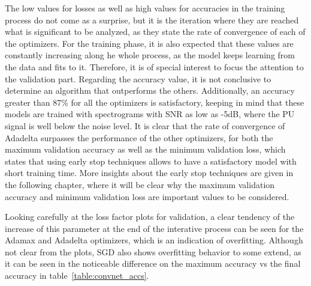 The low values for losses as well as high values for accuracies in the training process do not come as a surprise, but it is the iteration where they are reached what is significant to be analyzed, as they state the rate of convergence of each of the optimizers. For the training phase, it is also expected that these values are constantly increasing along he whole process, as the model keeps learning from the data and fits to it. Therefore, it is of special interest to focus the attention to the validation part. Regarding the accuracy value, it is not conclusive to determine an algorithm that outperforms the others. Additionally, an accuracy greater than 87\% for all the optimizers is satisfactory, keeping in mind that these models are trained with spectrograms with SNR as low as -5dB, where the \ac{PU} signal is well below the noise level. It is clear that the rate of convergence of Adadelta surpasses the performance of the other optimizers, for both the maximum validation accuracy as well as the minimum validation loss, which states that using early stop techniques allows to have a satisfactory model with short training time. More insights about the early stop techniques are given in the following chapter, where it will be clear why the maximum validation accuracy and minimum validation loss are important values to be considered.

Looking carefully at the loss factor plots for validation, a clear tendency of the increase of this parameter at the end of the interative process can be seen for the Adamax and Adadelta optimizers, which is an indication of overfitting. Although not clear from the plots, SGD also shows overfitting behavior to some extend, as it can be seen in the noticeable difference on the maximum accuracy vs the final accuracy in table~\ref{table:convnet_accs}.

